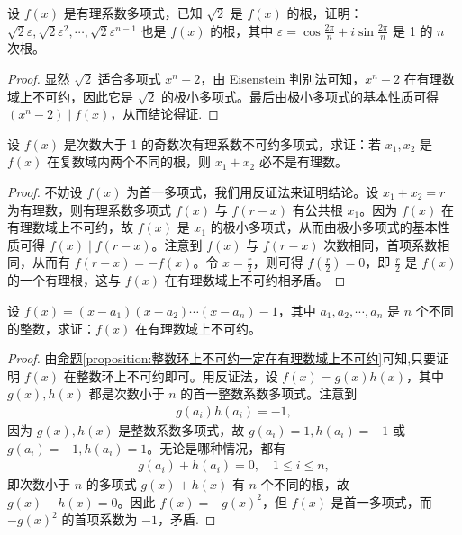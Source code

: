 \documentclass[lang=cn,newtx,10pt,scheme=chinese]{elegantbook}
\begin{document}
\begin{example}
设 $f(x)$ 是有理系数多项式，已知 $\sqrt{2}$ 是 $f(x)$ 的根，证明：$\sqrt{2} \varepsilon, \sqrt{2} \varepsilon^2, \cdots, \sqrt{2} \varepsilon^{n-1}$ 也是 $f(x)$ 的根，其中 $\varepsilon = \cos \frac{2\pi}{n} + i \sin \frac{2\pi}{n}$ 是 1 的 $n$ 次根。  
\end{example}
\begin{proof}
显然 $\sqrt{2}$ 适合多项式 $x^n - 2$，由 Eisenstein 判别法可知，$x^n - 2$ 在有理数域上不可约，因此它是 $\sqrt{2}$ 的极小多项式。最后由\hyperref[proposition:极小多项式的基本性质]{极小多项式的基本性质}可得 $(x^n - 2) \mid f(x)$，从而结论得证.
\end{proof}

\begin{example}
设 $f(x)$ 是次数大于 1 的奇数次有理系数不可约多项式，求证：若 $x_1, x_2$ 是 $f(x)$ 在复数域内两个不同的根，则 $x_1 + x_2$ 必不是有理数。
\end{example}
\begin{proof}
不妨设 $f(x)$ 为首一多项式，我们用反证法来证明结论。设 $x_1 + x_2 = r$ 为有理数，则有理系数多项式 $f(x)$ 与 $f(r - x)$ 有公共根 $x_1$。因为 $f(x)$ 在有理数域上不可约，故 $f(x)$ 是 $x_1$ 的极小多项式，从而由极小多项式的基本性质可得 $f(x) \mid f(r - x)$。注意到 $f(x)$ 与 $f(r - x)$ 次数相同，首项系数相同，从而有 $f(r - x) = -f(x)$。令 $x = \frac{r}{2}$，则可得 $f\left(\frac{r}{2}\right) = 0$，即 $\frac{r}{2}$ 是 $f(x)$ 的一个有理根，这与 $f(x)$ 在有理数域上不可约相矛盾。
\end{proof}

\begin{example}
设 $f(x) = (x - a_1)(x - a_2) \cdots (x - a_n) - 1$，其中 $a_1, a_2, \cdots, a_n$ 是 $n$ 个不同的整数，求证：$f(x)$ 在有理数域上不可约。
\end{example}
\begin{proof}
由\hyperref[proposition:整数环上不可约一定在有理数域上不可约]{命题\ref{proposition:整数环上不可约一定在有理数域上不可约}}可知,只要证明 $f(x)$ 在整数环上不可约即可。用反证法，设 $f(x) = g(x)h(x)$，其中 $g(x), h(x)$ 都是次数小于 $n$ 的首一整数系数多项式。注意到
\begin{align*}
g(a_i)h(a_i) = -1,
\end{align*}
因为 $g(x), h(x)$ 是整数系数多项式，故 $g(a_i) = 1, h(a_i) = -1$ 或 $g(a_i) = -1, h(a_i) = 1$。无论是哪种情况，都有
\begin{align*}
g(a_i) + h(a_i) = 0, \quad 1 \leq i \leq n,
\end{align*}
即次数小于 $n$ 的多项式 $g(x) + h(x)$ 有 $n$ 个不同的根，故 $g(x) + h(x) = 0$。因此 $f(x) = -g(x)^2$，但 $f(x)$ 是首一多项式，而 $-g(x)^2$ 的首项系数为 $-1$，矛盾.
\end{proof}
\end{document}
